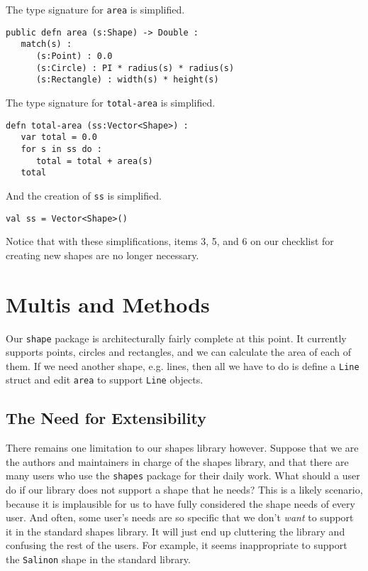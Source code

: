 \documentclass[10pt,oneside]{book}
\begin{document}
The type signature for \texttt{\frenchspacing area} is simplified.
\begin{lstlisting}
public defn area (s:Shape) -> Double :
   match(s) :
      (s:Point) : 0.0
      (s:Circle) : PI * radius(s) * radius(s)
      (s:Rectangle) : width(s) * height(s)
\end{lstlisting}

The type signature for \texttt{\frenchspacing total-area} is simplified.
\begin{lstlisting}
defn total-area (ss:Vector<Shape>) :
   var total = 0.0
   for s in ss do :
      total = total + area(s)
   total   
\end{lstlisting}

And the creation of \texttt{\frenchspacing ss} is simplified.
\begin{lstlisting}
val ss = Vector<Shape>()
\end{lstlisting}

Notice that with these simplifications, items 3, 5, and 6 on our checklist for creating new shapes are no longer necessary.

\section{Multis and Methods}
Our \texttt{\frenchspacing shape} package is architecturally fairly complete at this point. It currently supports points, circles and rectangles, and we can calculate the area of each of them. If we need another shape, e.g. lines, then all we have to do is define a \texttt{\frenchspacing Line} struct and edit \texttt{\frenchspacing area} to support \texttt{\frenchspacing Line} objects. 

\subsection*{The Need for Extensibility}
There remains one limitation to our shapes library however. Suppose that we are the authors and maintainers in charge of the shapes library, and that there are many users who use the \texttt{\frenchspacing shapes} package for their daily work. What should a user do if our library does not support a shape that he needs? This is a likely scenario, because it is implausible for us to have fully considered the shape needs of every user. And often, some user's needs are so specific that we don't {\em want} to support it in the standard shapes library. It will just end up cluttering the library and confusing the rest of the users. For example, it seems inappropriate to support the \texttt{\frenchspacing Salinon} shape in the standard library. 
\end{document}
